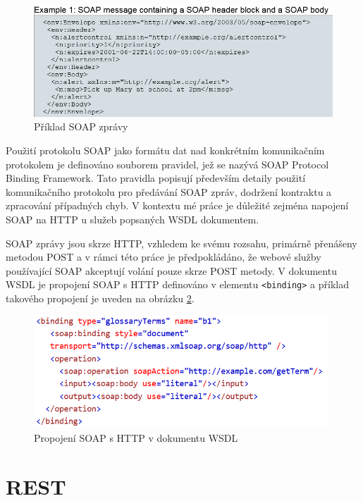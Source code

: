 \documentclass[czech,DP]{thesiskiv}
\begin{document}
\begin{figure}[h]
	\centering
	\includegraphics[width=\linewidth]{soap-msg-example}
	\caption{Příklad SOAP zprávy}
	\label{fig:soap-msg-example}
\end{figure}

Použití protokolu SOAP jako formátu dat nad konkrétním komunikačním protokolem je definováno souborem pravidel, jež se nazývá SOAP Protocol Binding Framework. Tato pravidla popisují především detaily použití komunikačního protokolu pro předávání SOAP zpráv, dodržení kontraktu a zpracování případných chyb. V kontextu mé práce je důležité zejména napojení SOAP na HTTP u služeb popsaných WSDL dokumentem.

SOAP zprávy jsou skrze HTTP, vzhledem ke svému rozsahu, primárně přenášeny metodou POST a v rámci této práce je předpokládáno, že webové služby používající SOAP akceptují volání pouze skrze POST metody. V dokumentu WSDL je propojení SOAP s HTTP definováno v elementu \verb|<binding>| a příklad takového propojení je uveden na obrázku \ref{fig:soap-http-binding}.

\begin{figure}[h]
	\centering
	\includegraphics[width=11cm]{soap-http-binding}
	\caption{Propojení SOAP s HTTP v dokumentu WSDL}
	\label{fig:soap-http-binding}
\end{figure}


\section{REST}
\label{sec:rest}
\end{document}

